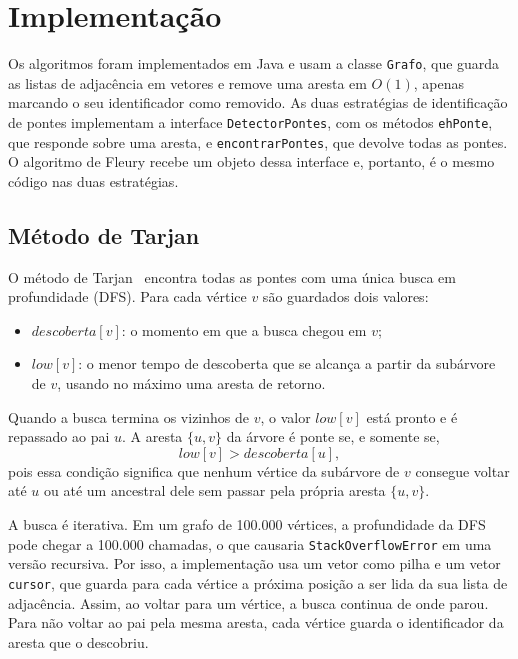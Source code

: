 %

\section{Implementação}

Os algoritmos foram implementados em Java e usam a classe \texttt{Grafo}, que guarda as listas de adjacência em vetores e remove uma aresta em $O(1)$, apenas marcando o seu identificador como removido. As duas estratégias de identificação de pontes implementam a interface \texttt{DetectorPontes}, com os métodos \texttt{ehPonte}, que responde sobre uma aresta, e \texttt{encontrarPontes}, que devolve todas as pontes. O algoritmo de Fleury recebe um objeto dessa interface e, portanto, é o mesmo código nas duas estratégias.

\subsection{Método de Tarjan}

O método de Tarjan~\cite{tarjan1974} encontra todas as pontes com uma única busca em profundidade (DFS). Para cada vértice $v$ são guardados dois valores:

\begin{itemize}
  \item $descoberta[v]$: o momento em que a busca chegou em $v$;
  \item $low[v]$: o menor tempo de descoberta que se alcança a partir da subárvore de $v$, usando no máximo uma aresta de retorno.
\end{itemize}

Quando a busca termina os vizinhos de $v$, o valor $low[v]$ está pronto e é repassado ao pai $u$. A aresta $\{u, v\}$ da árvore é ponte se, e somente se,
\[
  low[v] > descoberta[u],
\]
pois essa condição significa que nenhum vértice da subárvore de $v$ consegue voltar até $u$ ou até um ancestral dele sem passar pela própria aresta $\{u, v\}$.

A busca é iterativa. Em um grafo de 100.000 vértices, a profundidade da DFS pode chegar a 100.000 chamadas, o que causaria \texttt{StackOverflowError} em uma versão recursiva. Por isso, a implementação usa um vetor como pilha e um vetor \texttt{cursor}, que guarda para cada vértice a próxima posição a ser lida da sua lista de adjacência. Assim, ao voltar para um vértice, a busca continua de onde parou. Para não voltar ao pai pela mesma aresta, cada vértice guarda o identificador da aresta que o descobriu.

